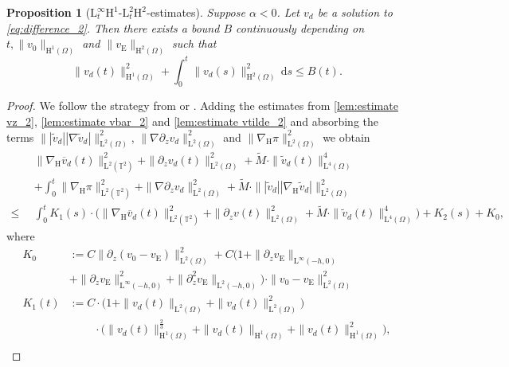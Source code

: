 \documentclass[preprint]{elsarticle}
\newtheorem{prop}[prop]{Proposition}
\numberwithin{equation}{section}
\newcommand {\T}	{\mathbb{T}}
\renewcommand{\d}{\, \mathrm{d}}
\renewcommand{\H}{\mathrm{H}}
\renewcommand{\bar}[1]{\overline{#1}}
\newcommand{\vbar}{\bar{v}}
\newcommand{\vtilde}{\tilde{v}}
\newcommand{\nablaH}{\nabla_{\H}}
\newcommand{\rL}{\mathrm{L}}
\newcommand{\rH}{\H}
\newcommand{\rE}{\mathrm{E}}
\begin{document}
\begin{prop}[$\rL^\infty_t\rH^1$-$\rL^2_t \rH^2$-estimates]\label{prop:estimate_2}
	Suppose $\alpha < 0$. %
	Let $v_d$ be a solution to \eqref{eq:difference_2}. Then there exists a bound $B$ continuously depending on $t, \| v_0 \|_{\rH^1(\Omega)}$ and $\| v_{\rE} \|_{\rH^2(\Omega)}$ such that 
	\begin{equation*}
		\| v_d(t) \|_{\rH^1(\Omega)}^2
		+ \int_0^t \| v_d(s) \|_{\rH^2(\Omega)}^2 \d s \leq B(t) .
	\end{equation*}
\end{prop}
\begin{proof}
	We follow the strategy from \cite[Step 4]{HK:16_2} or \cite[Step 4]{GGHHK:20_2}. Adding the estimates from \autoref{lem:estimate vz_2}, \autoref{lem:estimate vbar_2} and \autoref{lem:estimate vtilde_2} and absorbing the terms $\| |\vtilde_d| |\nabla \vtilde_d| \|_{\rL^2(\Omega)}^2$, $\| \nabla \partial_z v_d \|_{\rL^2(\Omega)}^2$ and $\| \nablaH \pi \|_{\rL^2(\Omega)}^2$ we obtain
	\begin{align*}
		&\| \nablaH \vbar_d(t) \|_{\rL^2(\T^2)}^2
		+ \| \partial_z v_d(t) \|_{\rL^2(\Omega)}^2
		+ \tilde{M} \cdot \| \vtilde_d(t) \|_{\rL^4(\Omega)}^4
		\\
		\enspace &
		+\int_0^t \| \nablaH \pi\|_{\rL^2(\T^2)}^2
		+ \| \nabla \partial_z v_d \|_{\rL^2(\Omega)}^2
		+ \tilde{M} \cdot \| |\vtilde_d| |\nablaH \vtilde_d| \|_{\rL^2(\Omega)}^2 
		\\
		\leq \enspace &\int_0^t K_1(s) \cdot \bigl( \| \nablaH \vbar_d(t) \|_{\rL^2(\T^2)}^2
		+ \| \partial_z v(t) \|_{\rL^2(\Omega)}^2
		+ \tilde{M} \cdot \| \vtilde_d(t) \|_{\rL^4(\Omega)}^4 \bigr) + K_2(s)
		+ K_0 ,
	\end{align*}
	where 
	\begin{align*}
		K_0 &:= C \| \partial_z (v_0 - v_{\rE}) \|_{\rL^2(\Omega)}^2
		+ C (1 + \| \partial_z v_{\rE} \|_{\rL^\infty(-h,0)} \\
		&+ \| \partial_z v_{\rE} \|_{\rL^\infty(-h,0)}^2 + \| \partial_z^2 v_{\rE} \|_{\rL^2(-h,0)}) \cdot \| v_0 - v_{\rE} \|_{\rL^2(\Omega)}^2 \\
		K_1(t) &:= C \cdot \bigl(1+ \| v_d(t) \|_{\rL^2(\Omega)} +\| v_d(t) \|_{\rL^2(\Omega)}^2\bigr) \\
		&\hspace{27pt}\cdot \bigl( \| v_d(t) \|_{\rH^1(\Omega)}^{\frac{2}{3}} + \| v_d (t) \|_{\rH^1(\Omega)} + \| v_d(t) \|_{\rH^1(\Omega)}^2 \bigr),\\

\end{align*}
\end{proof}
\end{document}
